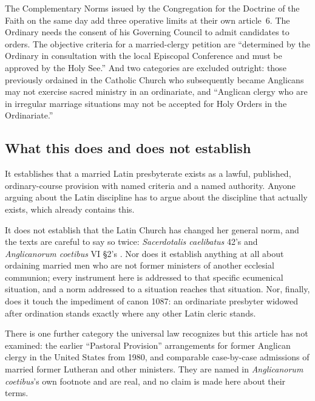 The Complementary Norms issued by the Congregation for the Doctrine of the Faith on the same day add three operative limits at their own article~6. The Ordinary needs the consent of his Governing Council to admit candidates to orders. The objective criteria for a married-clergy petition are ``determined by the Ordinary in consultation with the local Episcopal Conference and must be approved by the Holy See.'' And two categories are excluded outright: those previously ordained in the Catholic Church who subsequently became Anglicans may not exercise sacred ministry in an ordinariate, and ``Anglican clergy who are in irregular marriage situations may not be accepted for Holy Orders in the Ordinariate.''

\subsection{What this does and does not establish}

It establishes that a married Latin presbyterate exists as a lawful, published, ordinary-course provision with named criteria and a named authority. Anyone arguing about the Latin discipline has to argue about the discipline that actually exists, which already contains this.

It does not establish that the Latin Church has changed her general norm, and the texts are careful to say so twice: \emph{Sacerdotalis caelibatus} 42's  and \emph{Anglicanorum coetibus} VI §2's . Nor does it establish anything at all about ordaining married men who are not former ministers of another ecclesial communion; every instrument here is addressed to that specific ecumenical situation, and a norm addressed to a situation reaches that situation. Nor, finally, does it touch the impediment of canon 1087: an ordinariate presbyter widowed after ordination stands exactly where any other Latin cleric stands.

There is one further category the universal law recognizes but this article has not examined: the earlier ``Pastoral Provision'' arrangements for former Anglican clergy in the United States from 1980, and comparable case-by-case admissions of married former Lutheran and other ministers. They are named in \emph{Anglicanorum coetibus}'s own footnote and are real, and no claim is made here about their terms.
